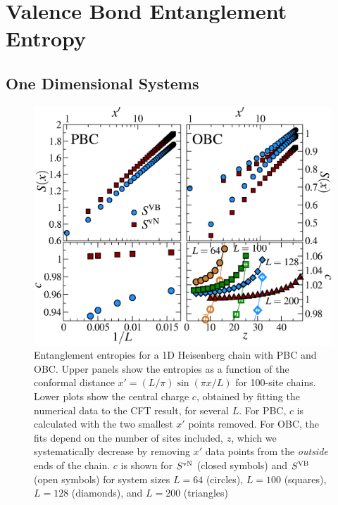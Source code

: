 \chapter{Valence Bond Entanglement Entropy}


\section{One Dimensional Systems}


\begin{figure} {
\includegraphics[width=6.5in]{./figures/paper1/figure1/4-panelFIG1.eps} 
\centering
\caption[1D Results for VB EE and von Neumann EE]{
{\color{red}
Entanglement entropies for a 1D Heisenberg chain with PBC and OBC. Upper
panels show the entropies as a function of the conformal distance $x'  = (L/\pi)\sin (\pi x/L)$ for
100-site chains.  Lower plots show the central
charge $c$, obtained by fitting the numerical data to the CFT result, for
several $L$.  For PBC, $c$ is calculated with the two smallest $x'$ points
removed.  For OBC, the fits depend on the number of sites included, $z$,
which we systematically decrease by removing $x'$ data points from the
{\it outside} ends of the chain.  $c$ is shown for $S^{\rm vN}$
(closed symbols) and $S^{\rm VB}$ (open symbols) for system sizes $L=64$
(circles), $L=100$ (squares), $L=128$ (diamonds), and $L=200$ (triangles)
\label{1D}}
} }
\end{figure}



